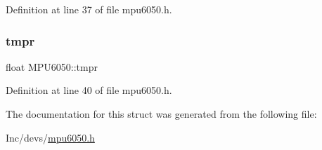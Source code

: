 Definition at line 37 of file mpu6050.\+h.

\mbox{\label{struct_m_p_u6050_ab0ab95d9f8ac9cc71b578e780ee7288a}} 
\subsubsection{\texorpdfstring{tmpr}{tmpr}}
{\footnotesize\ttfamily float M\+P\+U6050\+::tmpr}



Definition at line 40 of file mpu6050.\+h.



The documentation for this struct was generated from the following file\+:\begin{DoxyCompactItemize}
\item 
Inc/devs/\mbox{\hyperlink{mpu6050_8h}{mpu6050.\+h}}\end{DoxyCompactItemize}
